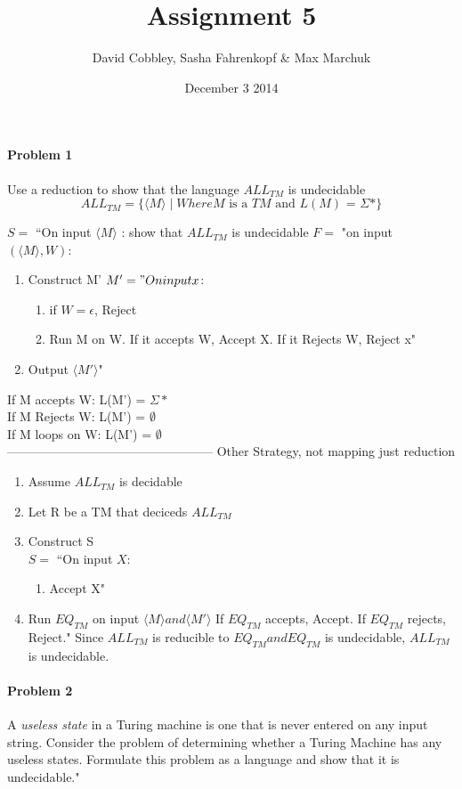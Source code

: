\documentclass{article}
\title{Assignment 5}
\author{David Cobbley, Sasha Fahrenkopf \& Max Marchuk}
\date{December 3 2014}
\begin{document}
\maketitle


\paragraph{Problem 1} Use a reduction to show that the language $ALL_{TM}$ is undecidable
\[ALL_{TM} = \{ \langle M \rangle \;|\; Where M \mbox{ is a $TM$ and $L(M)$ = $\Sigma$*}\} \]


$S =$ ``On input $\langle M \rangle$ :
show that $ALL_{TM}$ is undecidable
$F =$ "on input $(\langle M \rangle , W)$:
\begin{enumerate}
\item Construct M'
$M' = "On input x$:
\begin{enumerate}[1]
\item if $ W = \epsilon$, Reject
\item Run M on W.
 If it accepts W, Accept X.
 If it Rejects W, Reject x"
\end{enumerate}
\item Output $\langle M' \rangle$"
\end{enumerate}

If M accepts W:  L(M') = $\Sigma*$
\\If M Rejects W:  L(M') = $\emptyset$
\\If M loops on W: L(M') = $\emptyset$
\\--------------------------------------------------
Other Strategy, not mapping just reduction
\begin{enumerate}
\item Assume $ALL_{TM}$ is decidable
\item Let R be a TM that deciceds $ALL_{TM}$
\item Construct S
\\ $S =$ ``On input $X$:
\begin{enumerate}[1]
\item Accept X"
\end{enumerate}
\item Run $EQ_{TM}$ on input $\langle M \rangle and \langle M' \rangle$ 
 If $EQ_{TM}$ accepts, Accept. 
 If $EQ_{TM}$ rejects, Reject."
Since $ALL_{TM}$ is reducible to $EQ_{TM} and EQ_{TM}$ is undecidable, $ALL_{TM}$ is undecidable.
\end{enumerate}


\paragraph{Problem 2} A \textit{useless state} in a Turing machine is one that is never entered on any input string. Consider the problem of determining whether a Turing Machine has any useless states. Formulate this problem as a language and show that it is undecidable."
\end{document}
